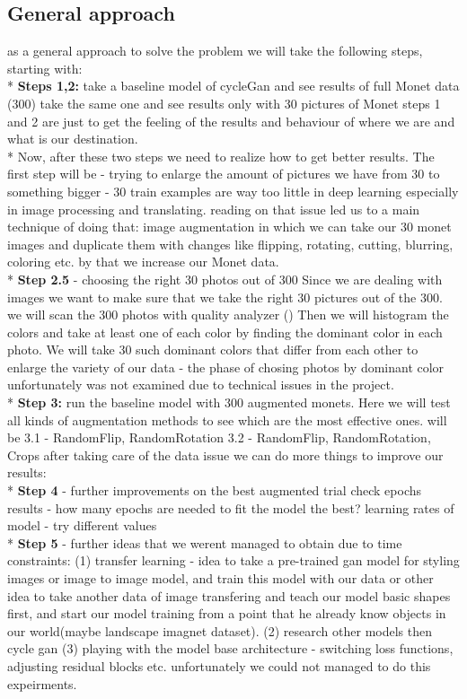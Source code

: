 \documentclass{article}
\begin{document}
    \subsection{General approach}
    as a general approach to solve the problem we will take the following steps, starting with:
    \\*
    \textbf{Steps 1,2:}
    take a baseline model of cycleGan and see results of full Monet data (300)
    take the same one and see results only with 30 pictures of Monet
    steps 1 and 2 are just to get the feeling of the results and behaviour of where we are and what is our destination.
    \\*
    Now, after these two steps we need to realize how to get better results.
    The first step will be - trying to enlarge the amount of pictures we have from 30 to something bigger - 30 train examples are way too little in deep learning especially in image processing and translating. reading on that issue led us to a main technique of doing that: image augmentation in which we can take our 30 monet images and duplicate them with changes like flipping, rotating, cutting, blurring, coloring etc. by that we increase our Monet data.
    \\*
    \textbf{Step 2.5} - choosing the right 30 photos out of 300
    Since we are dealing with images we want to make sure that we take the right 30 pictures out of the 300.
    we will scan the 300 photos with quality analyzer ()
    Then we will histogram the colors and take at least one of each color by finding the dominant color in each photo. We will take 30 such dominant colors that differ from each other to enlarge the variety of our data - the phase of chosing photos by dominant color unfortunately was not examined due to technical issues in the project.
    \\*
    \textbf{Step 3:}
    run the baseline model with 300 augmented monets.
    Here we will test all kinds of augmentation methods to see which are the most effective ones. will be
    3.1 - RandomFlip, RandomRotation
    3.2 - RandomFlip, RandomRotation, Crops
    after taking care of the data issue we can do more things to improve our results:
    \\*
    \textbf{Step 4} - further improvements on the best augmented trial
    check epochs results - how many epochs are needed to fit the model the best?
    learning rates of model - try different values
    \\*
    \textbf{Step 5 }- further ideas that we werent managed to obtain due to time constraints:
    (1) transfer learning - idea to take a pre-trained gan model for styling images or image to image model, and train this model with our data or other idea to take another data of image transfering and teach our model basic shapes first, and start our model training from a point that he already know objects in our world(maybe landscape imagnet dataset).
    (2) research other models then cycle gan
    (3) playing with the model base architecture - switching loss functions, adjusting residual blocks etc.
    unfortunately we could not managed to do this expeirments.
\end{document}
